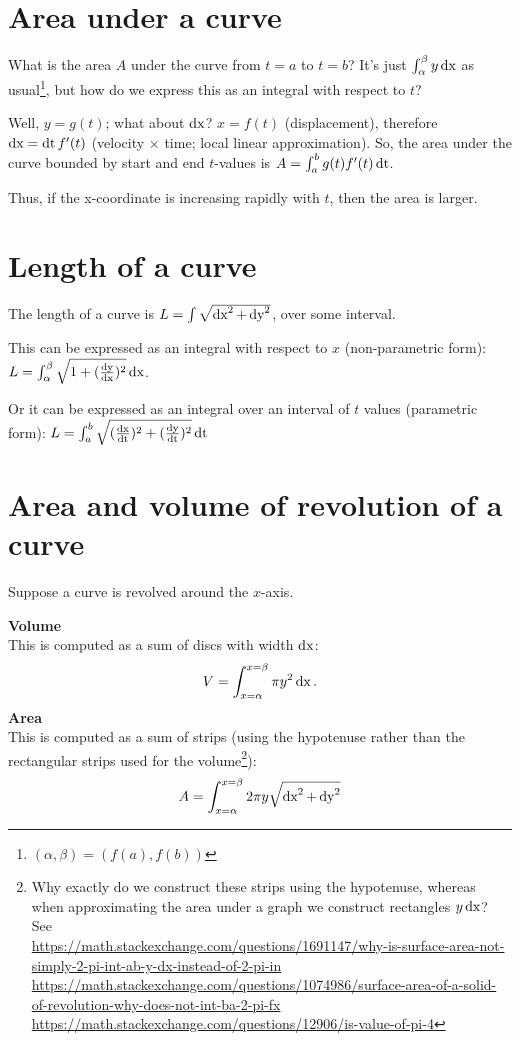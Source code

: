 \documentclass[12pt]{article}
\begin{document}
\section*{Area under a curve}

What is the area $A$ under the curve from $t=a$ to $t=b$? It's just
$\int_\alpha^\beta y \operatorname{\text{dx}}$ as usual\footnote{$(\alpha, \beta) = (f(a), f(b))$},
but how do we express this as an integral with respect to $t$?

Well, $y = g(t)$; what about $\operatorname{\text{dx}}$? $x = f(t)$ (displacement), therefore
$\operatorname{\text{dx}} = \operatorname{\text{dt}} f'(t)$ (velocity $\times$ time; local linear approximation). So, the
area under the curve bounded by start and end $t$-values is
$A = \int_a^b g(t) f'(t) \operatorname{\text{dt}}$.

Thus, if the x-coordinate is increasing rapidly with $t$, then the area is
larger.

\section*{Length of a curve}

The length of a curve is $L = \int \sqrt{\operatorname{\text{dx}}^2 + \operatorname{\text{dy}}^2}$, over some interval.

This can be expressed as an integral with respect to $x$ (non-parametric form):
$L = \int_\alpha^\beta \sqrt{1 + (\frac{\operatorname{\text{dy}}}{\operatorname{\text{dx}}})^2} \operatorname{\text{dx}}$.

Or it can be expressed as an integral over an interval of $t$ values (parametric form):
$L = \int_a^b \sqrt{ (\frac{\operatorname{\text{dx}}}{\operatorname{\text{dt}}})^2 + (\frac{\operatorname{\text{dy}}}{\operatorname{\text{dt}}})^2} \operatorname{\text{dt}}$

\section*{Area and volume of revolution of a curve}
Suppose a curve is revolved around the $x$-axis.

\textbf{Volume}\\
This is computed as a sum of discs with width $\operatorname{\text{dx}}$:
\begin{align*}
  V = \int_{x=\alpha}^{x=\beta} \pi y^2 \operatorname{\text{dx}}.
\end{align*}
\textbf{Area}\\
This is computed as a sum of strips (using the hypotenuse rather than the rectangular strips used for the volume\footnote{Why exactly do we
  construct these strips using the hypotenuse, whereas when approximating the
  area under a graph we construct rectangles $y\operatorname{\text{dx}}$? See \\
  \url{https://math.stackexchange.com/questions/1691147/why-is-surface-area-not-simply-2-pi-int-ab-y-dx-instead-of-2-pi-in}\\
  \url{https://math.stackexchange.com/questions/1074986/surface-area-of-a-solid-of-revolution-why-does-not-int-ba-2-pi-fx}\\
  \url{https://math.stackexchange.com/questions/12906/is-value-of-pi-4}}):
\begin{align*}
  A = \int_{x=\alpha}^{x=\beta}  2\pi y \sqrt{\operatorname{\text{dx}}^2 + \operatorname{\text{dy}}^2}
\end{align*}
\end{document}
